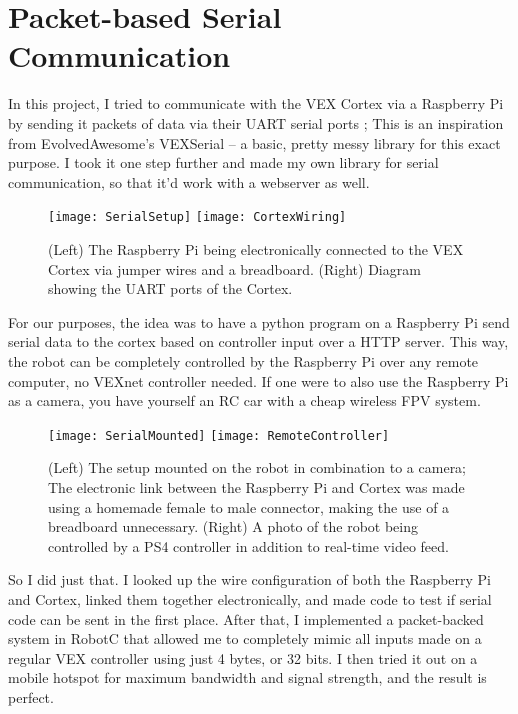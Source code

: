 \section{Packet-based Serial Communication}
In this project, I tried to communicate with the VEX Cortex via a Raspberry Pi by sending it packets of data via their UART serial ports \cite{UARTBasic}; This is an inspiration from EvolvedAwesome's VEXSerial \cite{VEXSerial} -- a basic, pretty messy library for this exact purpose. I took it one step further and made my own library for serial communication, so that it'd work with a webserver as well.

\begin{figure}[h]
    \centering
    \texttt{[image: SerialSetup]}
    \texttt{[image: CortexWiring]}
    \caption{
        (Left) The Raspberry Pi being electronically connected to the VEX Cortex via jumper wires and a breadboard. (Right) Diagram showing the UART ports of the Cortex. \cite{CortexWiringCite}
    }
\end{figure}

For our purposes, the idea was to have a python program on a Raspberry Pi send serial data to the cortex based on controller input over a HTTP server. This way, the robot can be completely controlled by the Raspberry Pi over any remote computer, no VEXnet controller needed. If one were to also use the Raspberry Pi as a camera, you have yourself an RC car with a cheap wireless FPV system.

\begin{figure}[h]
    \centering

    \texttt{[image: SerialMounted]}
    \texttt{[image: RemoteController]}
    \caption {
        (Left) The setup mounted on the robot in combination to a camera; The electronic link between the Raspberry Pi and Cortex was made using a homemade female to male connector, making the use of a breadboard unnecessary. (Right) A photo of the robot being controlled by a PS4 controller in addition to real-time video feed.
    }
\end{figure}

So I did just that. I looked up the wire configuration of both the Raspberry Pi and Cortex, linked them together electronically, and made code to test if serial code can be sent in the first place. After that, I implemented a packet-backed system in RobotC that allowed me to completely mimic all inputs made on a regular VEX controller using just 4 bytes, or 32 bits. I then tried it out on a mobile hotspot for maximum bandwidth and signal strength, and the result is perfect.

